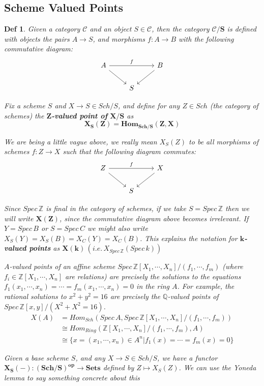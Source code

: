 \documentclass{article}
\newtheorem{definition}[theorem]{Def}
\begin{document}
\newpage
\subsection{Scheme Valued Points}
\begin{definition}
Given a category $\mathcal C$ and an object $S \in\mathcal C$, then the category
$\bm{\mathcal C/S}$ is defined with objects the pairs $A \rightarrow S$, and morphisms $f : A \rightarrow B$ with the following commutative
diagram:
\[\begin{tikzcd}
	A && B \\
	& S
	\arrow[from=1-1, to=2-2]
	\arrow["f", from=1-1, to=1-3]
	\arrow[from=1-3, to=2-2]
\end{tikzcd}\]

Fix a scheme $S$ and $X\to S\in Sch/S$, and define for any $Z \in Sch$ (the category of schemes) the $\bm Z$\textbf{-valued point of} $\bm{X/S}$ as
$$\bm{X_S(Z) = Hom_{Sch/S}(Z, X)}$$

We are being a little vague above, we really mean $X_S(Z)$ to be all morphisms of schemes $f : Z \to X$
such that the following diagram commutes:
\[\begin{tikzcd}
	Z && X \\
	& S
	\arrow[from=1-1, to=2-2]
	\arrow["f", from=1-1, to=1-3]
	\arrow[from=1-3, to=2-2]
\end{tikzcd}\]

Since $Spec\,\mathbb Z$ is final in the category of schemes, if we take $S = Spec\,\mathbb Z$ then we will write $\bm{X(Z)}$, since
the commutative diagram above becomes irrelevant. If $Y = Spec\, B$ or $S = Spec\, C$ we might also write
$X_S(Y)=X_S(B)=X_C(Y)=X_C(B)$.
This explains the notation for $\bm k$\textbf{-valued points} as $\bm{X(k)}\,(i.e.\,X_{Spec\,\mathbb Z}(Spec\, k))$

$A$-valued
points of an affine scheme $Spec\,\mathbb Z[X_1,\cdots, X_n]/(f_1,\cdots, f_m)$ (where $f_i \in\mathbb Z[X_1,\cdots, X_n]$ are
relations) are precisely the solutions to the equations
$f_1(x_1,\cdots, x_n) =\cdots= f_m(x_1,\cdots, x_n) = 0$
in the ring $A$. For example, the rational solutions to $x^2 + y^2 = 16$ are precisely the
$\mathbb Q$-valued points of $Spec\,\mathbb Z[x, y]/(X^2 + X^2 = 16)$.
\begin{align*}
\label{sup}
X(A)&=Hom_{Sch}(Spec\, A,Spec\,\mathbb Z[X_1,\cdots, X_n]/(f_1,\cdots, f_m))\\
&\cong Hom_{Ring}(\mathbb Z[X_1,\cdots, X_n]/(f_1,\cdots, f_m),A)\\
&\cong\{x=(x_1,\cdots, x_n)\in A^n|f_1(x) =\cdots= f_m(x) = 0\}
 \end{align*}
 
Given a base scheme $S$, and any
$X\to S\in Sch/S$, we have a functor $\bm{X_S(−) : (Sch /S)
^{op}\to Sets}$ defined by $Z \mapsto X_S(Z)$. We can use the
Yoneda lemma to say something concrete about this
\end{definition}
\end{document}
